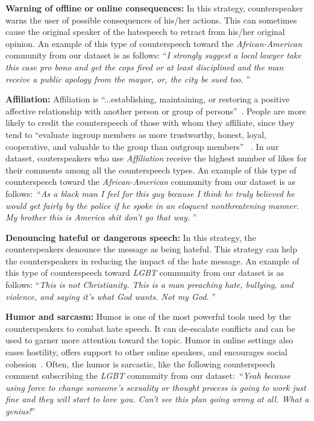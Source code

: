 \documentclass[11pt,a4paper]{article}
\newcommand{\TODO}[1]{\textcolor{red}{#1}}
\newcommand{\binny}[1]{\textcolor{blue}{[Binny: #1]}}
\begin{document}
{\iffalse \TODO{PG: what are these 2 statements, which of these is a counterspeech?}\binny{Done.}\fi

\noindent\textbf{Warning of offline or online consequences:}
In this strategy, counterspeaker warns the user of possible consequences of his/her actions. This can sometimes cause the original speaker of the hatespeech to retract from his/her original opinion. An example of this type of counterspeech toward the {\sl African-American} community from our dataset is as follows: \textquotedblleft \textit{I strongly suggest a local lawyer take this case pro bono and get the cops fired or at least disciplined and the man receive a public apology from the mayor, or, the city be sued too.} \textquotedblright

\noindent\textbf{Affiliation:}
Affiliation is \textquotedblleft...establishing, maintaining, or restoring a positive affective relationship with another person or group of persons\textquotedblright ~\cite{byrne1961anxiety}. People are more likely to credit the counterspeech of those with whom they affiliate, since they tend to ``evaluate ingroup members as more trustworthy, honest, loyal, cooperative, and valuable to the group than outgroup members'' ~\cite{kane2005knowledge}. In our dataset, couterspeakers who use {\sl Affiliation} receive the highest number of likes for their comments among all the counterspeech types. An example of this type of counterspeech toward the {\sl African-American} community from our dataset is as follows:~\textquotedblleft \textit{As a black man I feel for this guy because I think he truly believed he would get fairly by the police if he spoke in an eloquent nonthreatening manner. My brother this is America shit don't go that way.} \textquotedblright

\noindent\textbf{Denouncing hateful or dangerous speech:}
In this strategy, the counterspeakers denounce the message as being hateful. This strategy can help the counterspeakers in reducing the impact of the hate message. An example of this type of counterspeech toward {\sl LGBT} community from our dataset is as follows: \textquotedblleft \textit{This is not Christianity. This is a man preaching hate, bullying, and violence, and saying it's what God wants. Not my God.} \textquotedblright

\noindent\textbf{Humor and sarcasm:}
Humor is one of the most powerful tools used by the counterspeakers to combat hate speech. It can de-escalate conflicts and can be used to garner more attention toward the topic. Humor in online settings also eases hostility, offers support to other online speakers, and encourages social cohesion~\cite{marone2015online}. Often, the humor is sarcastic, like the following counterspeech comment subscribing the {\sl LGBT} community from our dataset:~\textquotedblleft \textit{Yeah because using force to change someone's sexuality or thought process is going to work just fine and they will start to love you. Can't see this plan going wrong at all. What a genius!}\textquotedblright

}
\end{document}
